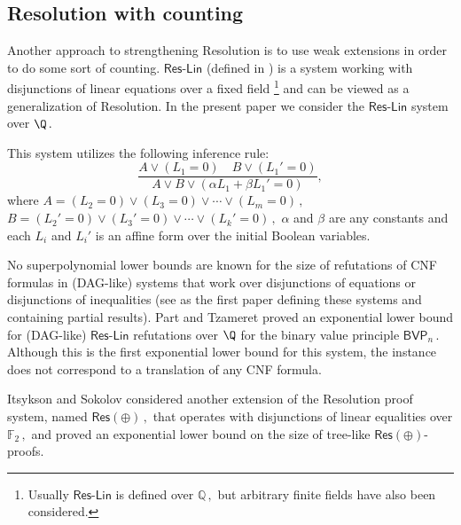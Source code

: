 \documentclass{toc}
\begin{document}
%
\subsection{Resolution with counting} %
Another approach to %
strengthening  %
%
Resolution %
is to use weak extensions in order to do some sort of counting. 
$\mathsf{Res}$-$\mathsf{Lin}$ (defined in \cite{RT07}) is a system working with disjunctions of
linear equations over a fixed field \footnote{Usually
$\mathsf{Res}$-$\mathsf{Lin}$ is defined %
%
%
over %
$\mathbb{Q}\,,$ %
 but %
%
%
arbitrary finite fields have also been considered.}  %
%
%
and can be viewed as a generalization of Resolution.  %
%
%
In the present paper we consider the $\mathsf{Res}$-$\mathsf{Lin}$ system over %
$\Q\,.$ %
%
%
%

%
This system   %
utilizes the following inference rule:
$$
 \frac{A \vee (L_1 = 0) \quad B \vee (L_1' = 0)}{A \vee B \vee (\alpha L_1 + \beta L_1' = 0)},  
$$
 where %
$A = (L_2 = 0) \vee (L_3 = 0) \vee \cdots \vee (L_m = 0)\,,$ %
$B = (L_2' = 0) \vee (L_3' = 0) \vee \cdots \vee (L_k' = 0)\,,$ %
 $\alpha$ and $\beta$ are
%
any  %
%
constants and each $L_i$ and $L_i'$ is %
%
an %
affine form over the initial Boolean variables.

%
%
%
%
%
No superpolynomial 
%
%
%
%
lower bounds are known for the size of refutations of %
CNF formulas  %
in (DAG-like) systems that
work over disjunctions of equations or  %
%
%
%
%
disjunctions of %
inequalities (see \cite{Kra98-Discretely} as the first paper defining these systems and containing partial results).  Part and Tzameret \cite{PT18_new} proved an exponential lower bound for (DAG-like) $\mathsf{Res}$-$\mathsf{Lin}$ refutations over $\Q$ for the  binary value principle %
$\mathsf{BVP}_n\,.$ %
 Although this is the first exponential lower bound for this system, the instance does not correspond to a translation of
%
any CNF formula.  %

Itsykson and Sokolov \cite{ITSYKSON2020102722} considered another extension of the
%
Resolution  %
proof system, %
%
named %
$\mathsf{Res}(\oplus)\,,$ %
that operates with disjunctions of linear equalities over %
$\mathbb{F}_2\,,$ %
%
 and proved an exponential lower bound on the size of tree-like $\mathsf{Res}(\oplus)$-proofs.

%
\end{document}
